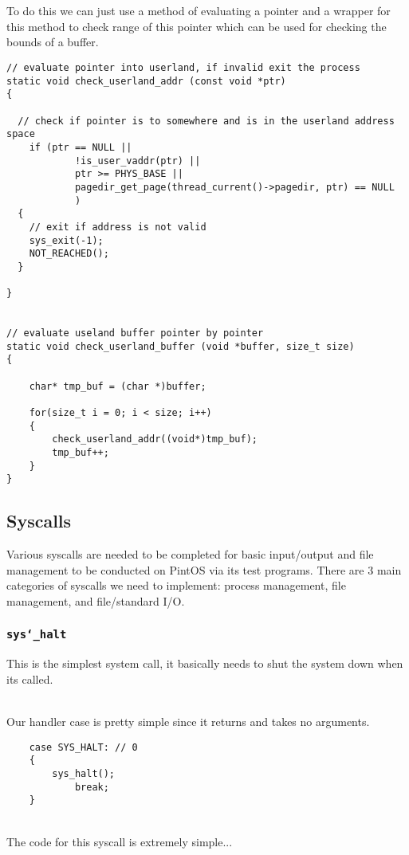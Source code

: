 \documentclass[]{article}
\begin{document}
  
  \texttt{}\\
  \newpage
  \textbf{}\\
  To do this we can just use a method of evaluating a pointer and a wrapper for this method to check range of this pointer which can be used for checking the bounds of a buffer.
 
       \lstset{language=C, tabsize=2}    
    \begin{lstlisting} 
// evaluate pointer into userland, if invalid exit the process
static void check_userland_addr (const void *ptr)
{

  // check if pointer is to somewhere and is in the userland address space
	if (ptr == NULL || 
			!is_user_vaddr(ptr) ||
			ptr >= PHYS_BASE ||
			pagedir_get_page(thread_current()->pagedir, ptr) == NULL
			)
  {
    // exit if address is not valid
    sys_exit(-1);
    NOT_REACHED();
  }

}


// evaluate useland buffer pointer by pointer
static void check_userland_buffer (void *buffer, size_t size)
{

	char* tmp_buf = (char *)buffer;
	
	for(size_t i = 0; i < size; i++)
	{
		check_userland_addr((void*)tmp_buf);
		tmp_buf++;
	}
}
\end{lstlisting}
  \newpage
  \subsection{Syscalls}
  Various syscalls are needed to be completed for basic input/output and file management to be conducted on PintOS via its test programs. There are 3 main categories of syscalls we need to implement: process management, file management, and file/standard I/O.
  \subsubsection{\texttt{sys\char`_halt}}
  This is the simplest system call, it basically needs to shut the system down when its called.
  
  \texttt{}
  \\
  Our handler case is pretty simple since it returns and takes no arguments.
  
       \lstset{language=C, tabsize=2}    
    \begin{lstlisting} 
	case SYS_HALT: // 0
	{
		sys_halt();
			break;
	}
	\end{lstlisting}
\texttt{}\\
The code for this syscall is extremely simple...
\end{document}
